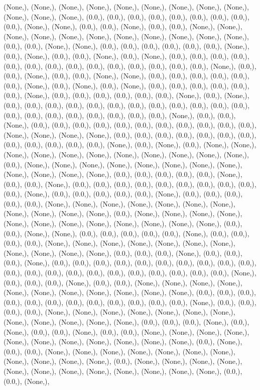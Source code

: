 \documentclass{article}
\begin{document}
(None,), (None,), (None,), (None,), (None,), (None,), (None,), (None,), (None,), (None,), (None,), (None,), (0.0,), (0.0,), (0.0,), (0.0,), (0.0,), (0.0,), (0.0,), (0.0,), (0.0,), (None,), (None,), (0.0,), (0.0,), (None,), (0.0,), (0.0,), (None,), (None,), (None,), (None,), (None,), (None,), (None,), (None,), (None,), (None,), (None,), (0.0,), (0.0,), (None,), (None,), (0.0,), (0.0,), (0.0,), (0.0,), (0.0,), (0.0,), (None,), (0.0,), (None,), (0.0,), (0.0,), (None,), (0.0,), (None,), (0.0,), (0.0,), (0.0,), (0.0,), (0.0,), (0.0,), (0.0,), (0.0,), (0.0,), (0.0,), (0.0,), (0.0,), (0.0,), (0.0,), (None,), (0.0,), (0.0,), (None,), (0.0,), (0.0,), (None,), (None,), (0.0,), (0.0,), (0.0,), (0.0,), (0.0,), (0.0,), (None,), (0.0,), (None,), (0.0,), (None,), (0.0,), (0.0,), (0.0,), (0.0,), (0.0,), (0.0,), (None,), (0.0,), (0.0,), (0.0,), (0.0,), (0.0,), (0.0,), (None,), (0.0,), (None,), (0.0,), (0.0,), (0.0,), (0.0,), (0.0,), (0.0,), (0.0,), (0.0,), (0.0,), (0.0,), (0.0,), (0.0,), (0.0,), (0.0,), (0.0,), (0.0,), (0.0,), (0.0,), (0.0,), (0.0,), (None,), (0.0,), (0.0,), (None,), (0.0,), (0.0,), (0.0,), (0.0,), (0.0,), (0.0,), (0.0,), (0.0,), (0.0,), (0.0,), (0.0,), (None,), (None,), (None,), (None,), (0.0,), (0.0,), (0.0,), (0.0,), (0.0,), (0.0,), (0.0,), (0.0,), (0.0,), (0.0,), (0.0,), (0.0,), (None,), (0.0,), (None,), (0.0,), (None,), (None,), (None,), (None,), (None,), (None,), (None,), (None,), (None,), (None,), (None,), (0.0,), (None,), (None,), (None,), (None,), (None,), (None,), (None,), (None,), (None,), (None,), (None,), (None,), (0.0,), (0.0,), (0.0,), (0.0,), (0.0,), (None,), (0.0,), (0.0,), (None,), (0.0,), (0.0,), (0.0,), (0.0,), (0.0,), (0.0,), (0.0,), (0.0,), (0.0,), (0.0,), (None,), (0.0,), (0.0,), (0.0,), (0.0,), (0.0,), (None,), (0.0,), (0.0,), (0.0,), (0.0,), (0.0,), (None,), (None,), (None,), (None,), (None,), (None,), (None,), (None,), (None,), (None,), (None,), (0.0,), (None,), (None,), (None,), (None,), (None,), (None,), (None,), (None,), (None,), (None,), (None,), (None,), (0.0,), (0.0,), (None,), (None,), (0.0,), (0.0,), (0.0,), (0.0,), (0.0,), (None,), (0.0,), (0.0,), (0.0,), (0.0,), (None,), (None,), (None,), (None,), (None,), (None,), (None,), (None,), (None,), (None,), (None,), (0.0,), (0.0,), (0.0,), (None,), (0.0,), (0.0,), (0.0,), (None,), (0.0,), (0.0,), (0.0,), (0.0,), (0.0,), (0.0,), (0.0,), (0.0,), (0.0,), (0.0,), (0.0,), (0.0,), (0.0,), (0.0,), (0.0,), (0.0,), (0.0,), (0.0,), (0.0,), (0.0,), (0.0,), (None,), (0.0,), (0.0,), (0.0,), (None,), (0.0,), (0.0,), (None,), (None,), (None,), (None,), (None,), (None,), (None,), (None,), (None,), (None,), (None,), (0.0,), (0.0,), (0.0,), (0.0,), (0.0,), (0.0,), (0.0,), (0.0,), (0.0,), (0.0,), (0.0,), (0.0,), (None,), (0.0,), (0.0,), (0.0,), (0.0,), (None,), (None,), (None,), (None,), (None,), (None,), (None,), (None,), (None,), (None,), (None,), (None,), (0.0,), (0.0,), (0.0,), (None,), (0.0,), (None,), (0.0,), (0.0,), (None,), (0.0,), (0.0,), (None,), (None,), (None,), (None,), (None,), (None,), (None,), (None,), (None,), (None,), (None,), (0.0,), (None,), (0.0,), (0.0,), (None,), (None,), (None,), (None,), (None,), (None,), (None,), (None,), (None,), (None,), (None,), (0.0,), (None,), (None,), (None,), (None,), (None,), (None,), (None,), (None,), (None,), (None,), (None,), (None,), (0.0,), (0.0,), (None,), 
\end{document}

